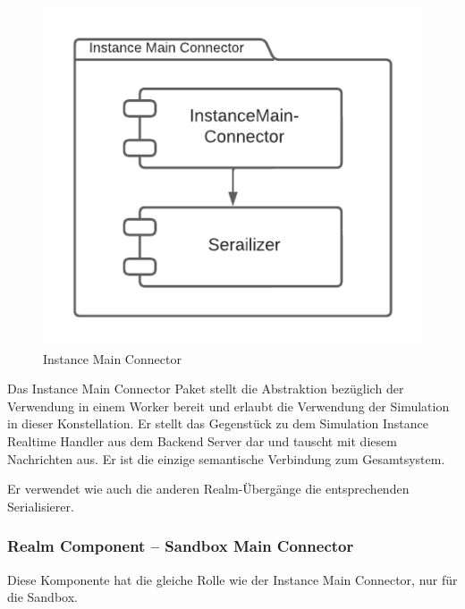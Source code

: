 \begin{figure}[htb]
    \centering
    \includegraphics[scale=.65,center]{medien/instance-main-connector.pdf}
    \caption{Instance Main Connector}
    \ownsource
    \label{fig:instance-main-connector}
\end{figure}

\FloatBarrier

Das Instance Main Connector Paket stellt die Abstraktion bezüglich der Verwendung in einem Worker bereit und erlaubt die Verwendung der Simulation in dieser Konstellation.
Er stellt das Gegenstück zu dem Simulation Instance Realtime Handler aus dem Backend Server dar und tauscht mit diesem Nachrichten aus.
Er ist die einzige semantische Verbindung zum Gesamtsystem.

Er verwendet wie auch die anderen Realm-Übergänge die entsprechenden Serialisierer.


\subsubsection{Realm Component – Sandbox Main Connector}

Diese Komponente hat die gleiche Rolle wie der Instance Main Connector, nur für die Sandbox.


